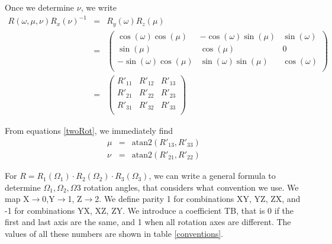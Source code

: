 \documentclass[prb]{revtex4}%
\begin{document}
Once we determine $\nu$, we write
\begin{eqnarray}
 \nonumber R(\omega, \mu, \nu) R_x(\nu)^{-1} &=& R_y(\omega) R_z(\mu) \\
    &=& \left(
          \begin{array}{ccc}
            \cos(\omega)\cos(\mu) & -\cos(\omega)\sin(\mu) & \sin(\omega) \\
            \sin(\mu) & \cos(\mu) & 0 \\
            -\sin(\omega)\cos(\mu) & \sin(\omega)\sin(\mu) & \cos(\omega) \\
          \end{array}
        \right)\label{twoRot}\\
 \nonumber&=&    \left(
                                                              \begin{array}{ccc}
                                                                R'_{11} & R'_{12} & R'_{13} \\
                                                                R'_{21} & R'_{22} & R'_{23} \\
                                                                R'_{31} & R'_{32} & R'_{33} \\
                                                              \end{array}
                                                            \right)
\end{eqnarray}

From equations \ref{twoRot}, we immediately find
\begin{eqnarray}
  \mu &=& \textrm{atan2}(R'_{13},R'_{33}) \\
  \nu &=& \textrm{atan2}(R'_{21},R'_{22})
\end{eqnarray}

For $R = R_1(\Omega_1) \cdot R_2(\Omega_2) \cdot R_3(\Omega_3)$, we can write a general formula to determine
$\Omega_1, \Omega_2, \Omega3$ rotation angles, that considers what convention we use. We
map X$\rightarrow$0,Y$\rightarrow$1, Z$\rightarrow$2. We define parity 1 for combinations XY, YZ, ZX, and -1 for combinations YX, XZ, ZY.
We introduce a coefficient TB, that is 0 if the first and last axis are the same, and 1 when all rotation axes are different. The values
of all these numbers are shown in table \ref{conventions}.
\end{document}
